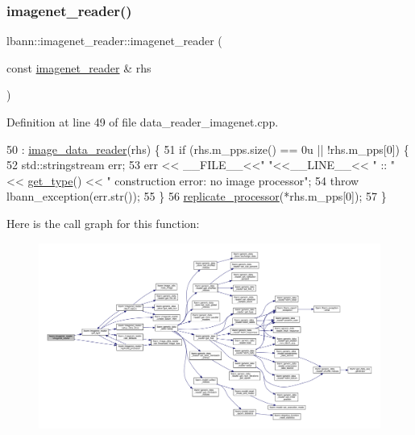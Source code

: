 \subsubsection{\texorpdfstring{imagenet\+\_\+reader()}{imagenet\_reader()}\hspace{0.1cm}{\footnotesize\ttfamily [3/3]}}
{\footnotesize\ttfamily lbann\+::imagenet\+\_\+reader\+::imagenet\+\_\+reader (\begin{DoxyParamCaption}\item[{const \hyperlink{classlbann_1_1imagenet__reader}{imagenet\+\_\+reader} \&}]{rhs }\end{DoxyParamCaption})}



Definition at line 49 of file data\+\_\+reader\+\_\+imagenet.\+cpp.


\begin{DoxyCode}
50   : \hyperlink{classlbann_1_1image__data__reader_a582185ab03c4643117fd93e0ba843882}{image\_data\_reader}(rhs) \{
51   \textcolor{keywordflow}{if} (rhs.m\_pps.size() == 0u || !rhs.m\_pps[0]) \{
52     std::stringstream err;
53     err << \_\_FILE\_\_<<\textcolor{stringliteral}{" "}<<\_\_LINE\_\_<< \textcolor{stringliteral}{" :: "} << \hyperlink{classlbann_1_1imagenet__reader_a0afea0db8b4286b56211842f8f1d7678}{get\_type}() << \textcolor{stringliteral}{" construction error: no image
       processor"};
54     \textcolor{keywordflow}{throw} lbann\_exception(err.str());
55   \}
56   \hyperlink{classlbann_1_1imagenet__reader_a1b642b5eb01b209e72bdd8dfa139cafd}{replicate\_processor}(*rhs.m\_pps[0]);
57 \}
\end{DoxyCode}
Here is the call graph for this function\+:\nopagebreak
\begin{figure}[H]
\begin{center}
\leavevmode
\includegraphics[width=350pt]{classlbann_1_1imagenet__reader_a18939cd7962491c30dc857622bad9666_cgraph}
\end{center}
\end{figure}
\mbox{\label{classlbann_1_1imagenet__reader_a5a4ef2ba813d1a68890532e1a42bdcba}} 
